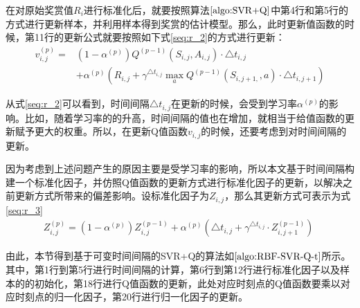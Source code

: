 在对原始奖赏值$R_{i}$进行标准化后，就要按照算法$\ref{algo:SVR+Q}$中第4行和第5行的方式进行更新样本，并利用样本得到奖赏的估计模型。那么，此时更新值函数的时候，第11行的更新公式就要按照如下式\eqref{seq:r_2}的方式进行更新：
\begin{equation}\label{seq:r_2}
\begin{aligned}
v_{i,j}^{(p)}=&(1-\alpha^{(p)})Q^{(p-1)}(S_{i,j},A_{i,j}) \cdot \triangle t_{i,j} \\
&+ \alpha^{(p)} (R_{i,j} + \gamma^{\triangle t_{i,j}} \max_{a} Q^{(p-1)}(S_{i,j+1,},a) \cdot \triangle t_{i,j+1})
\end{aligned}
\end{equation}

从式\eqref{seq:r_2}可以看到，时间间隔$\triangle t_{i,j}$在更新的时候，会受到学习率$\alpha^{(p)}$的影响。比如，随着学习率的的升高，时间间隔的值也在增加，就相当于给值函数的更新赋予更大的权重。所以，在更新Q值函数$v_{i,j}$的时候，还要考虑到对时间间隔的更新。

因为考虑到上述问题产生的原因主要是受学习率的影响，所以本文基于时间间隔构建一个标准化因子，并仿照Q值函数的更新方式进行标准化因子的更新，以解决之前更新方式所带来的偏差影响。设标准化因子为$Z_{i,j}$，那么其更新方式可表示为式\eqref{seq:r_3}
\begin{equation}\label{seq:r_3}
\begin{aligned}
Z^{(p)}_{i,j}=(1-\alpha^{(p)})Z^{(p-1)}_{i,j}+\alpha^{(p)}(\triangle t_{i,j} + \gamma^{\triangle t_{i,j}} \cdot Z^{(p-1)}_{i,j+1})\;
\end{aligned}
\end{equation}

由此，本节得到基于可变时间间隔的SVR+Q的算法如$\ref{algo:RBF-SVR-Q-t}$所示。其中，第1行到第5行进行时间间隔的计算，第6行到第12行进行标准化因子以及样本的的初始化，第18行进行Q值函数的更新，此处对应时刻点的Q值函数要乘以对应时刻点的归一化因子，第20行进行归一化因子的更新。

